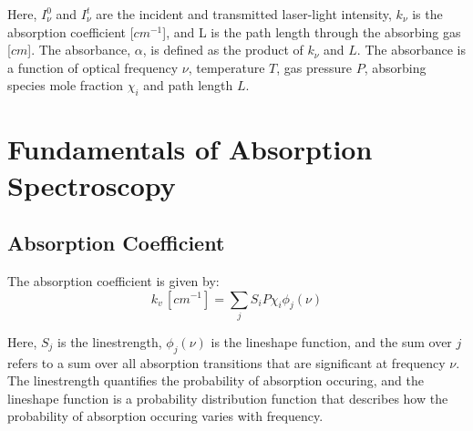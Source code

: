 \noindent Here, $I_\nu^0$ and $I_\nu^t$ are the incident and transmitted laser-light intensity, $k_\nu$ is the absorption coefficient [$cm^{-1}$], and L is the path length through the absorbing gas [$cm$]. The absorbance, $\alpha$, is defined as the product of $k_\nu$ and $L$. The absorbance is a function of optical frequency $\nu$, temperature $T$, gas pressure $P$, absorbing species mole fraction $\chi_i$ and path length $L$. 


\section{Fundamentals of Absorption Spectroscopy}
\subsection{Absorption Coefficient}
The absorption coefficient is given by:
\begin{equation}\label{}
k_v\,[cm^{-1}]=\sum_jS_{i}P\chi_i\phi_j(\nu) 
\end{equation}

\noindent Here, $S_j$ is the linestrength, $\phi_j(\nu)$ is the lineshape function, and the sum over $j$ refers to a sum over all absorption transitions that are significant at frequency $\nu$. The linestrength quantifies the probability of absorption occuring, and the lineshape function is a probability distribution function that describes how the probability of absorption occuring varies with frequency.




